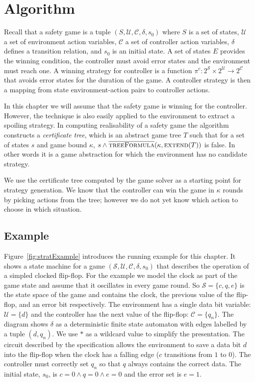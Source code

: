 \section{Algorithm}

Recall that a safety game is a tuple $(S, \mathcal{U}, \mathcal{C}, \delta, s_0)$ where $S$ is a set of states, $\mathcal{U}$ a set of environment action variables, $\mathcal{C}$ a set of controller action variables, $\delta$ defines a transition relation, and $s_0$ is an initial state. A set of states $E$ provides the winning condition, the controller must avoid error states and the environment must reach one. A winning strategy for controller is a function $\pi^c : 2^{\mathcal{S}} \times 2^{\mathcal{U}} \to 2^{\mathcal{C}}$ that avoids error states for the duration of the game. A controller strategy is then a mapping from state environment-action pairs to controller actions.

In this chapter we will assume that the safety game is winning for the controller. However, the technique is also easily applied to the environment to extract a spoiling strategy. In computing realisability of a safety game the algorithm constructs a \emph{certificate tree}, which is an abstract game tree $T$ such that for a set of states $s$ and game bound $\kappa$, $s \land \textsc{$\overline{\mbox{treeFormula}}$}(\kappa, \textsc{extend}(T))$ is false. In other words it is a game abstraction for which the environment has no candidate strategy.

We use the certificate tree computed by the game solver as a starting point for strategy generation.  We know that the controller can win the game in $\kappa$ rounds by picking actions from the tree; however we do not yet know which action to choose in which situation.


\subsection{Example}

Figure~\ref{fig:stratExample} introduces the running example for this chapter. It shows a state machine for a game $(\mathcal{S}, \mathcal{U}, \mathcal{C}, \delta, s_0)$ that describes the operation of a simpled clocked flip-flop. For the example we model the clock as part of the game state and assume that it oscillates in every game round. So $\mathcal{S} = \{ c, q, e \}$ is the state space of the game and contains the clock, the previous value of the flip-flop, and an error bit respectively. The environment has a single data bit variable: $\mathcal{U} = \{ d \}$ and the controller has the next value of the flip-flop: $\mathcal{C} = \{ q_n \}$. The diagram shows $\delta$ as a deterministic finite state automaton with edges labelled by a tuple $(d, q_n)$. We use $*$ as a wildcard value to simplify the presentation. The circuit described by the specification allows the environment to save a data bit $d$ into the flip-flop when the clock has a falling edge ($c$ transitions from $1$ to $0$). The controller must correctly set $q_n$ so that $q$ always contains the correct data. The initial state, $s_0$, is $c = 0 \land q = 0 \land e = 0$ and the error set is $e = 1$.

